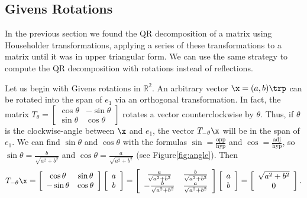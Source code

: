 \subsection*{Givens Rotations} %

In the previous section we found the QR decomposition of a matrix using Householder transformations, applying a series of these transformations to a matrix until it was in upper triangular form.
We can use the same strategy to compute the QR decomposition with rotations instead of reflections.

Let us begin with Givens rotations in $\mathbb{R}^2$.
An arbitrary vector $\x = (a, b)\trp$ can be rotated into the span of $e_1$ via an orthogonal transformation.
In fact, the matrix $T_{\theta} = \left[\begin{array}{cc}\cos \theta & - \sin \theta \\ \sin \theta & \cos \theta \end{array}\right]$ rotates a vector counterclockwise by $\theta$.
Thus, if $\theta$ is the clockwise-angle between $\x$ and $e_1$, the vector $T_{-\theta}\x$ will be in the span of $e_1$.
We can find $\sin \theta$ and $\cos \theta$ with the formulas $\sin = \frac{\text{opp}}{\text{hyp}}$ and $\cos = \frac{\text{adj}}{\text{hyp}}$, so $\sin \theta = \frac{b}{\sqrt{a^2+b^2}}$ and $\cos \theta =  \frac{a}{\sqrt{a^2+b^2}}$ (see Figure\ref{fig:angle}).
Then
\[
T_{-\theta}\x
=
\left[\begin{array}{cc}
\cos\theta  & \sin\theta \\
-\sin\theta & \cos\theta \\
\end{array}\right]
\left[\begin{array}{c} a \\ b \end{array}\right]
=
\left[\begin{array}{cc}
 \frac{a}{\sqrt{a^2+b^2}} & \frac{b}{\sqrt{a^2+b^2}} \\
-\frac{b}{\sqrt{a^2+b^2}} & \frac{a}{\sqrt{a^2+b^2}} \\
\end{array}\right]
\left[\begin{array}{c} a \\ b \end{array}\right]
=
\left[\begin{array}{c} \sqrt{a^2+b^2} \\ 0 \end{array}\right].
\]

